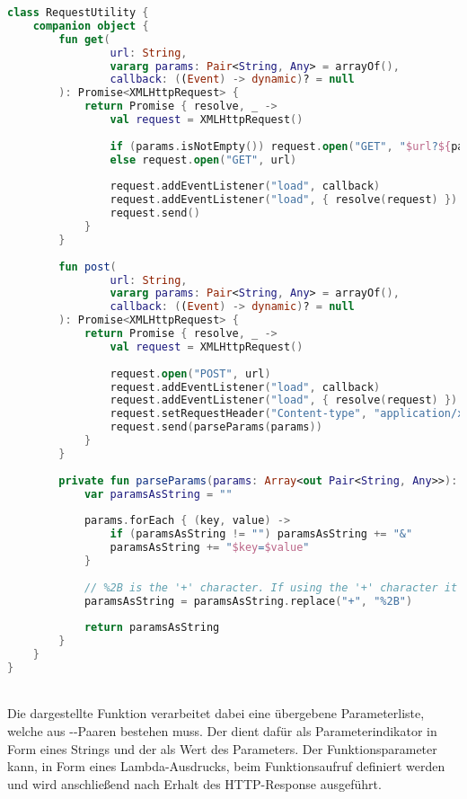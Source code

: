 \begin{lstlisting}[style=lstStyleFramed, language=Kotlin, caption={Implementierung der Request-Methoden \code{GET} und \code{POST}, inklusive der Parameterverarbeitung}, label=lst:requestUtility, float]
class RequestUtility {
	companion object {
		fun get(
				url: String, 
				vararg params: Pair<String, Any> = arrayOf(), 
				callback: ((Event) -> dynamic)? = null
		): Promise<XMLHttpRequest> {
			return Promise { resolve, _ ->
				val request = XMLHttpRequest()
				
				if (params.isNotEmpty()) request.open("GET", "$url?${parseParams(params)}")
				else request.open("GET", url)
				
				request.addEventListener("load", callback)
				request.addEventListener("load", { resolve(request) })
				request.send()
			}
		}
	
		fun post(
				url: String, 
				vararg params: Pair<String, Any> = arrayOf(), 
				callback: ((Event) -> dynamic)? = null
		): Promise<XMLHttpRequest> {
			return Promise { resolve, _ ->
				val request = XMLHttpRequest()
				
				request.open("POST", url)
				request.addEventListener("load", callback)
				request.addEventListener("load", { resolve(request) })
				request.setRequestHeader("Content-type", "application/x-www-form-urlencoded")
				request.send(parseParams(params))
			}
		}
	
		private fun parseParams(params: Array<out Pair<String, Any>>): String {
			var paramsAsString = ""
			
			params.forEach { (key, value) ->
				if (paramsAsString != "") paramsAsString += "&"
				paramsAsString += "$key=$value"
			}
			
			// %2B is the '+' character. If using the '+' character it will parse into a space character
			paramsAsString = paramsAsString.replace("+", "%2B")
			
			return paramsAsString
		}
	}
}
\end{lstlisting}
\\
Die dargestellte Funktion  verarbeitet dabei eine übergebene Parameterliste, welche aus --Paaren bestehen muss. Der  dient dafür als Parameterindikator in Form eines Strings und der  als Wert des Parameters. Der Funktionsparameter  kann, in Form eines Lambda-Ausdrucks, beim Funktionsaufruf definiert werden und wird anschließend nach Erhalt des \gls{HTTP}-Response ausgeführt.\\
